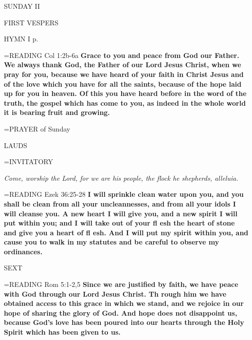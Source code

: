 \begin{center}\normalsize SUNDAY II\\
\end{center}

\begin{flushleft}\normalsize FIRST VESPERS\\\end{flushleft}

HYMN I p. \pageref{ordinaryTime:firstHymn}

\hangindent=\parindent \small{READING} Col 1:2b-6a \textbf{Grace to you and peace from God our Father.  We always thank God, the Father of our Lord Jesus Christ, when we pray for you, because we have heard of your faith in Christ Jesus and of the love which you have for all the saints, because of the hope laid up for you in heaven. Of this you have heard before in the word of the truth, the gospel which has come to you, as indeed in the whole world it is bearing fruit and growing.  \\}

\hangindent=\parindent \small{PRAYER  of Sunday}

\begin{flushleft}\normalsize LAUDS\\\end{flushleft}

\hangindent=\parindent \small{INVITATORY}
\begin{center}
\textit{Come, worship the Lord, for we are his people, the flock he shepherds, alleluia.\\}
\end{center}

\hangindent=\parindent \small{READING} Ezek 36:25-28 \textbf{I will sprinkle clean water upon you, and you shall be clean from all your uncleannesses, and from all your idols I will cleanse you. A new heart I will give you, and a new spirit I will put within you; and I will take out of your fl esh the heart of stone and give you a heart of fl esh. And I will put my spirit within you, and cause you to walk in my statutes and be careful to observe my ordinances.\\}

\begin{flushleft}\normalsize SEXT\\\end{flushleft}

\hangindent=\parindent \small{READING} Rom 5:1-2,5 \textbf{Since we are justified by faith, we have peace with God through our Lord Jesus Christ. Th rough him we have obtained access to this grace in which we stand, and we rejoice in our hope of sharing the glory of God. And hope does not disappoint us, because God’s love has been poured into our hearts through the Holy Spirit which has been given to us.  }

